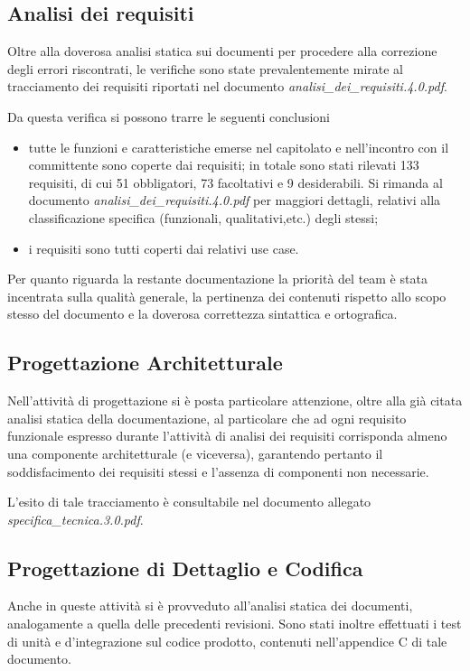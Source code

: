\subsection{Analisi dei requisiti}
Oltre alla doverosa analisi statica sui documenti per procedere alla correzione degli errori riscontrati, le verifiche sono state prevalentemente mirate al tracciamento dei requisiti riportati nel documento \textit{analisi\_dei\_requisiti.4.0.pdf}.

Da questa verifica si possono trarre le seguenti conclusioni
\begin{itemize}
\item tutte le funzioni e caratteristiche emerse nel capitolato e nell'incontro con il committente sono coperte dai requisiti;
in totale sono stati rilevati 133 requisiti, di cui 51 obbligatori,  73 facoltativi e 9 desiderabili. Si rimanda al documento \textit{analisi\_dei\_requisiti.4.0.pdf} per maggiori dettagli, relativi alla classificazione specifica (funzionali, qualitativi,etc.) degli stessi;

\item i requisiti sono tutti coperti dai relativi use case.
\end{itemize}

Per quanto riguarda la restante documentazione la priorità del team è stata incentrata sulla qualità generale, la pertinenza dei contenuti rispetto allo scopo stesso del documento e la doverosa correttezza sintattica e ortografica.

\subsection {Progettazione Architetturale}
Nell'attività di progettazione si è posta particolare attenzione, oltre alla già citata analisi statica della documentazione, al particolare che ad ogni requisito funzionale espresso durante l'attività di analisi dei requisiti corrisponda almeno una componente architetturale (e viceversa), garantendo pertanto il soddisfacimento dei requisiti stessi e l'assenza di componenti non necessarie.

L'esito di tale tracciamento è consultabile nel documento allegato \textit{specifica\_tecnica.3.0.pdf}.

\subsection {Progettazione di Dettaglio e Codifica}
Anche in queste attività si è provveduto all'analisi statica dei documenti, analogamente a quella delle precedenti revisioni.
Sono stati inoltre effettuati i test di unità e d'integrazione sul codice prodotto, contenuti nell'appendice C di tale documento.

